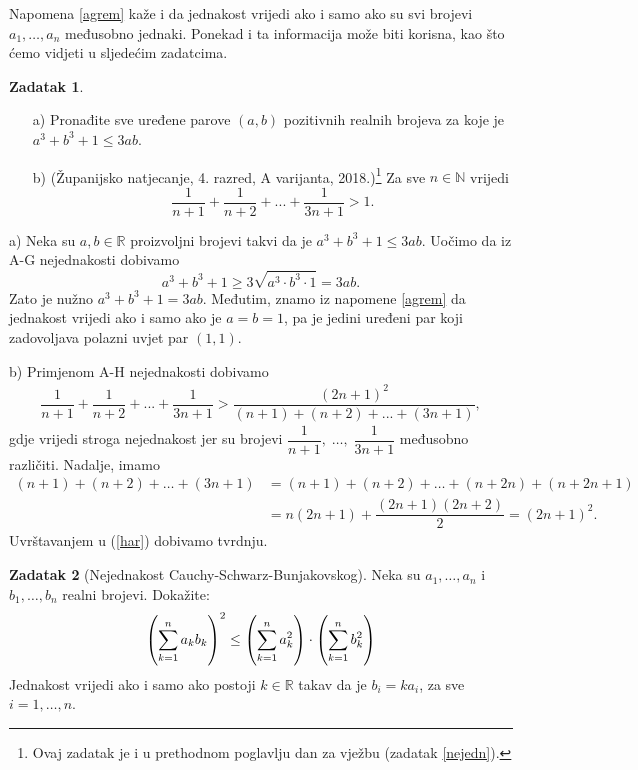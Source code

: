 \documentclass{book}
\let\originalleft\left
\let\originalright\right
\renewcommand{\left}{\mathopen{}\mathclose\bgroup\originalleft}
\renewcommand{\right}{\aftergroup\egroup\originalright}
\renewenvironment{proof}{%
    \vspace{-\parskip}\begin{oldproof}%
    }{%
    \end{oldproof}%
}
\theoremstyle{definition}
\theoremstyle{definition}
\newtheorem{exercise}{Zadatak}
\theoremstyle{remark}
\begin{document}
Napomena \ref{agrem} kaže i da jednakost vrijedi ako i samo ako su svi brojevi $a_1, \dots, a_n$ međusobno jednaki. Ponekad i ta informacija može biti korisna, kao što ćemo vidjeti u sljedećim zadatcima.
\begin{exercise} \textbf{}
\begin{itemize}
\item[a)] Pronađite sve uređene parove $(a, b)$ pozitivnih realnih brojeva za koje je $a^3+b^3+1\leq 3ab$.
\item[b)] (Županijsko natjecanje, 4. razred, A varijanta, 2018.)\footnote{Ovaj zadatak je i u prethodnom poglavlju dan za vježbu (zadatak \ref{nejedn}).} Za sve $n\in \mathbb{N}$ vrijedi $$\dfrac{1}{n+1}+\dfrac{1}{n+2}+...+\dfrac{1}{3n+1}>1.$$
\end{itemize}
\end{exercise}
\begin{proof}[Rješenje]
a) Neka su $a, b\in \mathbb{R}$ proizvoljni brojevi takvi da je $a^3+b^3+1\leq 3ab$. Uočimo da iz A-G nejednakosti dobivamo $$a^3+b^3+1\geq 3\sqrt{a^3\cdot b^3\cdot 1}=3ab.$$
Zato je nužno $a^3+b^3+1=3ab$. Međutim, znamo iz napomene \ref{agrem} da jednakost vrijedi ako i samo ako je $a=b=1$, pa je jedini uređeni par koji zadovoljava polazni uvjet par $(1, 1)$.

b) Primjenom A-H nejednakosti dobivamo
\begin{align}
\label{har}
\dfrac{1}{n+1}+\dfrac{1}{n+2}+...+\dfrac{1}{3n+1}>\dfrac{(2n+1)^2}{(n+1)+(n+2)+...+(3n+1)},   
\end{align}
gdje vrijedi stroga nejednakost jer su brojevi $\dfrac{1}{n+1},\; \dots,\; \dfrac{1}{3n+1}$ međusobno različiti. Nadalje, imamo
\begin{align*}
(n+1)+(n+2)+\dots+(3n+1)&=(n+1)+(n+2)+\dots+(n+2n)+(n+2n+1)\\
&=n(2n+1)+\dfrac{(2n+1)(2n+2)}{2}=(2n+1)^2.
\end{align*}
Uvrštavanjem u (\ref{har}) dobivamo tvrdnju.
\end{proof}
\begin{exercise}[Nejednakost Cauchy-Schwarz-Bunjakovskog]
Neka su $a_1, \dots, a_n$ i $b_1, \dots, b_n$ realni brojevi. Dokažite:
$$\left(\sum_{k=1}^n{a_kb_k}\right)^2\leq \left(\sum_{k=1}^n{a_k^2}\right)\cdot\left(\sum_{k=1}^n{b_k^2}\right)$$
Jednakost vrijedi ako i samo ako postoji $k\in \mathbb{R}$ takav da je $b_i=ka_i$, za sve $i=1, \dots, n$.
\end{exercise}
\end{document}
